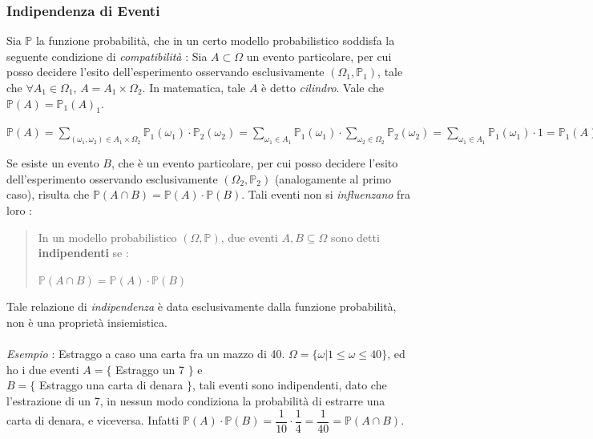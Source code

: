\documentclass[12pt, letterpaper]{article}
\begin{document}
\subsubsection{Indipendenza di Eventi}
Sia \(\mathbb{P}\) la funzione probabilità, che in un certo modello probabilistico soddisfa la seguente 
condizione di \textit{compatibilità} : Sia \(A\subset\Omega\) un evento particolare, per cui posso decidere 
l'esito dell'esperimento osservando esclusivamente \((\Omega_1,\mathbb{P}_1)\), tale che \(\forall A_1 \in \Omega_1\), \(A=A_1\times \Omega_2\).
In matematica, tale \(A\) è detto \textit{cilindro}. Vale che \(\mathbb{P}(A)=\mathbb{P}_1(A)_1\).\begin{center}
\(
  \mathbb{P}(A)=\displaystyle\sum_{(\omega_1,\omega_2)\in A_1\times\Omega_2}\mathbb{P}_1(\omega_1)\cdot\mathbb{P}_2(\omega_2)  
    =\displaystyle\sum_{\omega_1\in A_1}\mathbb{P}_1(\omega_1)\cdot\displaystyle\sum_{\omega_2\in \Omega_2}\mathbb{P}_2(\omega_2)=\displaystyle\sum_{\omega_1\in A_1}\mathbb{P}_1(\omega_1)\cdot 1=\mathbb{P}_1(A)_1
  \)
\end{center}
Se esiste un evento \(B\), che è un evento particolare, per cui posso decidere 
l'esito dell'esperimento osservando esclusivamente \((\Omega_2,\mathbb{P}_2)\) (analogamente al primo caso), 
risulta che \(\mathbb{P}(A\cap B)=\mathbb{P}(A)\cdot\mathbb{P}(B)\). Tali eventi non si \textit{influenzano} 
fra loro : \begin{quote}
    In un modello probabilistico \((\Omega,\mathbb{P})\), due eventi \(A,B\subseteq \Omega\) sono detti 
    \textbf{indipendenti} se : \begin{center}
        \(\mathbb{P}(A\cap B)=\mathbb{P}(A)\cdot\mathbb{P}(B)\)
    \end{center}
\end{quote}
Tale relazione di \textit{indipendenza} è data esclusivamente dalla funzione probabilità, non è 
una proprietà insiemistica.\\\hphantom{.}\\\textit{Esempio }:
Estraggo a caso una carta fra un mazzo di 40. \(\Omega=\{\omega|1\le\omega\le40\} \), 
ed ho i due eventi \(A=\{\) Estraggo un 7 \(\}\) e \\\(B=\{\) Estraggo una carta di denara \(\}\), tali 
eventi sono indipendenti, dato che l'estrazione di un 7, in nessun modo condiziona la probabilità di 
estrarre una carta di denara, e viceversa. Infatti \(\mathbb{P}(A)\cdot\mathbb{P}(B)=\dfrac{1}{10}\cdot\dfrac{1}{4}=\dfrac{1}{40}=\mathbb{P}(A\cap B)\).
\\\hphantom{.}\\
\end{document}
